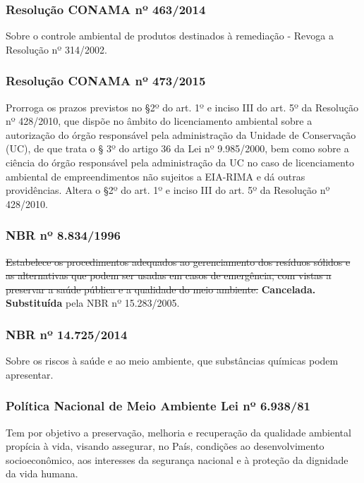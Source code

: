 \begin{subapend}
\begin{subsubapend}
		\subsubsection{Resolução CONAMA nº 463/2014}
		Sobre o controle ambiental de produtos destinados à remediação - Revoga a Resolução nº 314/2002.
		\subsubsection{Resolução CONAMA nº 473/2015}
		Prorroga os prazos previstos no §2º do art. 1º e inciso III do art. 5º da Resolução nº 428/2010, que dispõe no âmbito do licenciamento ambiental sobre a autorização do órgão responsável pela administração da Unidade de Conservação (UC), de que trata o § 3º do artigo 36 da Lei nº 9.985/2000, bem como sobre a ciência do órgão responsável pela administração da UC no caso de licenciamento ambiental de empreendimentos não sujeitos a EIA-RIMA e dá outras providências. Altera o §2º do art. 1º e inciso III do art. 5º da Resolução nº 428/2010.
		\subsubsection{NBR nº 8.834/1996}
		\sout{Estabelece os procedimentos adequados ao gerenciamento dos resíduos sólidos e as alternativas que podem ser usadas em casos de emergência, com vistas a preservar a saúde pública e a qualidade do meio ambiente.} \textbf{Cancelada. Substituída} pela NBR nº 15.283/2005.
		\subsubsection{NBR nº 14.725/2014}
		Sobre os riscos à saúde e ao meio ambiente, que substâncias químicas podem apresentar.
		\subsubsection{Política Nacional de Meio Ambiente Lei nº 6.938/81}
		Tem por objetivo a preservação, melhoria e recuperação da qualidade ambiental propícia à vida, visando assegurar, no País, condições ao desenvolvimento socioeconômico, aos interesses da segurança nacional e à proteção da dignidade da vida humana.
	\end{subsubapend}
\end{subapend}

